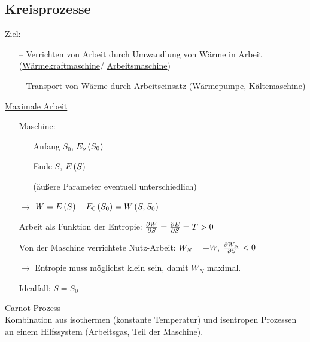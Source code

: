 \subsection{Kreisprozesse}
\uline{Ziel}:
\begin{itemize}[align=left]
  \item[--] Verrichten von Arbeit durch Umwandlung von Wärme in Arbeit (\uline{Wärme\-kraft\-maschine}/ \uline{Arbeitsmaschine})
  \item[--] Transport von Wärme durch Arbeitseinsatz (\uline{Wärmepumpe}, \uline{Kältemaschine})
\end{itemize}
\uline{Maximale Arbeit}
\begin{itemize}[align=left]
  \item[Maschine:]
  \begin{itemize}[align=left]
      \item[]
      \item[Anfang] $S_0$, $E_o\left( S_0 \right)$
      \item[Ende] $S$, $E\left( S \right)$
      \item[(äußere Parameter eventuell unterschiedlich)]
    \end{itemize}
  \item[$\rightarrow$] $W=E\left( S \right) - E_0\left( S_0 \right) = W\left( S,S_0 \right)$
  \item[Arbeit als  Funktion der Entropie:] $\frac{\partial W}{\partial S} = \frac{\partial E}{\partial S} = T > 0$
  \item[Von der Maschine verrichtete Nutz-Arbeit:] $W_N = -W$, $\frac{\partial W_N}{\partial S} < 0$
  \item[$\rightarrow$] Entropie muss möglichst klein sein, damit $W_N$ maximal.
  \item[Idealfall:] $S=S_0$
\end{itemize}

\uline{Carnot-Prozess}\\
Kombination aus isothermen (konstante Temperatur) und isentropen Prozessen an einem Hilfssystem (Arbeitsgas, Teil der Maschine).

